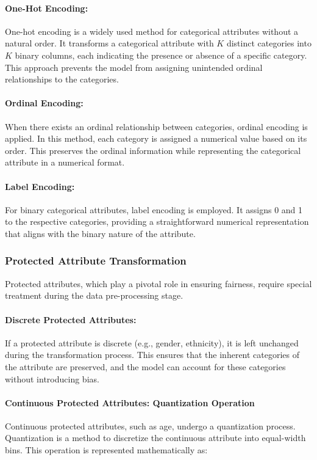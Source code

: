 \paragraph{One-Hot Encoding:}
One-hot encoding is a widely used method for categorical attributes without a natural order. It transforms a categorical attribute with \(K\) distinct categories into \(K\) binary columns, each indicating the presence or absence of a specific category. This approach prevents the model from assigning unintended ordinal relationships to the categories.

\paragraph{Ordinal Encoding:}
When there exists an ordinal relationship between categories, ordinal encoding is applied. In this method, each category is assigned a numerical value based on its order. This preserves the ordinal information while representing the categorical attribute in a numerical format.

\paragraph{Label Encoding:}
For binary categorical attributes, label encoding is employed. It assigns 0 and 1 to the respective categories, providing a straightforward numerical representation that aligns with the binary nature of the attribute.

\subsubsection{Protected Attribute Transformation}

Protected attributes, which play a pivotal role in ensuring fairness, require special treatment during the data pre-processing stage.

\paragraph{Discrete Protected Attributes:}
If a protected attribute is discrete (e.g., gender, ethnicity), it is left unchanged during the transformation process. This ensures that the inherent categories of the attribute are preserved, and the model can account for these categories without introducing bias.

\paragraph{Continuous Protected Attributes: Quantization Operation}
Continuous protected attributes, such as age, undergo a quantization process. Quantization is a method to discretize the continuous attribute into equal-width bins. This operation is represented mathematically as:

